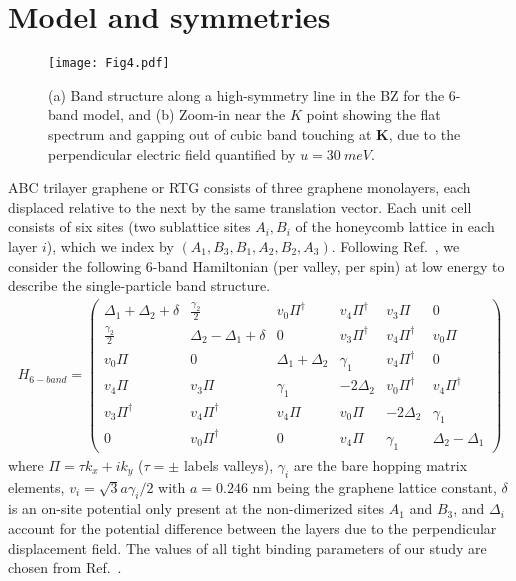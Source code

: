\documentclass[aps,pra,twocolumn,superscriptaddress,10pt,article,nofootinbib,showpacs,longbibliography]{revtex4-1}
\def \K{{\mathbf K}}
\def \beq{\begin{eqnarray}}
\def \eeq{\end{eqnarray}}
\begin{document}
\section{Model and symmetries}

\begin{figure}[htbp]
    \centering
    \texttt{[image: Fig4.pdf]}
    \caption{(a) Band structure along a high-symmetry line in the BZ for the 6-band model, and (b) Zoom-in near the $K$ point showing the flat spectrum and gapping out of cubic band touching at $\K$, due to the perpendicular electric field quantified by $u = \SI{30}{meV}$.}
    \label{fig:BandStrucSM}
\end{figure}

ABC trilayer graphene or RTG consists of three graphene monolayers, each displaced relative to the next by the same translation vector.
Each unit cell consists of six sites (two sublattice sites $A_i,B_i$ of the honeycomb lattice in each layer $i$), which we index by $(A_1,B_3,B_1,A_2,B_2,A_3)$.
Following Ref.~, we consider the following 6-band Hamiltonian (per valley, per spin) at low energy to describe the single-particle band structure. 
\beq
H_{6-band} = \begin{pmatrix} \Delta_1 + \Delta_2 + \delta  & \frac{\gamma_2}{2} & v_0 \Pi^\dagger & v_4 \Pi^\dagger & v_3 \Pi & 0 \\ \frac{\gamma_2}{2} & \Delta_2 - \Delta_1 + \delta & 0 & v_3 \Pi^\dagger & v_4 \Pi^\dagger & v_0 \Pi \\ v_0 \Pi & 0 & \Delta_1 + \Delta_2 & \gamma_1 & v_4 \Pi^\dagger & 0 \\ v_4 \Pi & v_3 \Pi & \gamma_1 & -2 \Delta_2 & v_0 \Pi^\dagger & v_4 \Pi^\dagger \\ v_3 \Pi^\dagger & v_4 \Pi^\dagger & v_4 \Pi & v_0 \Pi & -2 \Delta_2 & \gamma_1 \\ 0 & v_0 \Pi^\dagger & 0 & v_4 \Pi & \gamma_1 & \Delta_2 - \Delta_1 \end{pmatrix}
\eeq
where $\Pi = \tau k_x + i k_y$ ($\tau = \pm$ labels valleys), $\gamma_i$ are the bare hopping matrix elements, $v_i = \sqrt{3} a \gamma_i/2$ with $a = 0.246$ nm being the graphene lattice constant, $\delta$ is an on-site potential only present at the non-dimerized sites $A_1$ and $B_3$, and $\Delta_i$ account for the potential difference between the layers due to the perpendicular displacement field.
The values of all tight binding parameters of our study are chosen from Ref.~.
\end{document}
